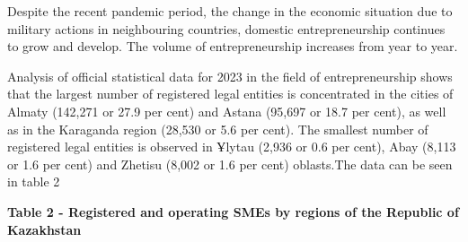 
Despite the recent pandemic period, the change in the economic situation
due to military actions in neighbouring countries, domestic
entrepreneurship continues to grow and develop. The volume of
entrepreneurship increases from year to year.

Analysis of official statistical data for 2023 in the field of
entrepreneurship shows that the largest number of registered legal
entities is concentrated in the cities of Almaty (142,271 or 27.9 per
cent) and Astana (95,697 or 18.7 per cent), as well as in the Karaganda
region (28,530 or 5.6 per cent). The smallest number of registered legal
entities is observed in Ұlytau (2,936 or 0.6 per cent), Abay (8,113 or
1.6 per cent) and Zhetisu (8,002 or 1.6 per cent) oblasts.The data can
be seen in table 2

{\bfseries Table 2 - Registered and operating SMEs by regions of the
Republic of Kazakhstan}

